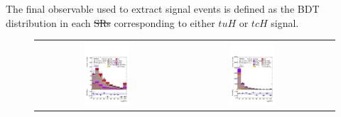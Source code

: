 \documentclass[PAPER, coverpage, atlasdraft=true, texlive=2016, UKenglish]{\ATLASLATEXPATH atlasdoc}
\providecommand{\DIFadd}[1]{{\protect\color{blue}\uwave{#1}}} %
\providecommand{\DIFdel}[1]{{\protect\color{red}\sout{#1}}}                      %
\providecommand{\DIFaddbegin}{} %
\providecommand{\DIFaddend}{} %
\providecommand{\DIFdelbegin}{} %
\providecommand{\DIFdelend}{} %
\begin{document}
\DIFdelend The final observable used to extract signal events is defined as the BDT distribution in each \DIFdelbegin \DIFdel{SRs }\DIFdelend \DIFaddbegin \DIFadd{SR }\DIFaddend corresponding to either $tuH$ or $tcH$ signal.
%
\begin{figure}[H]
\centering
\begin{tabular}{@{}ccc@{}}
\includegraphics[page=1,width=0.33\textwidth]{figures/reg1l2tau1bnj_os.pdf} &
\includegraphics[page=1,width=0.33\textwidth]{figures/reg1l1tau1b1j_ss.pdf}&

\end{tabular}
\end{figure}
\end{document}
